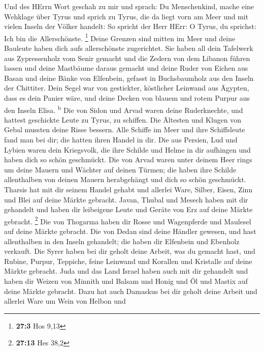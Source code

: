  Und des HErrn Wort geschah zu mir und sprach:
 Du Menschenkind, mache eine Wehklage über Tyrus
 und sprich zu Tyrus, die da liegt vorn am Meer und mit
vielen Inseln der Völker handelt: So spricht der Herr HErr: O Tyrus, du
sprichst: Ich bin die Allerschönste. \footnote{\textbf{27:3} Hos 9,13}
 Deine Grenzen sind mitten im Meer und deine Bauleute
haben dich aufs allerschönste zugerichtet.  Sie haben all
dein Tafelwerk aus Zypressenholz vom Senir gemacht und die Zedern von
dem Libanon führen lassen und deine Mastbäume daraus gemacht
 und deine Ruder von Eichen aus Basan und deine Bänke von
Elfenbein, gefasst in Buchsbaumholz aus den Inseln der Chittiter.
 Dein Segel war von gestickter, köstlicher Leinwand aus
Ägypten, dass es dein Panier wäre, und deine Decken von blauem und rotem
Purpur aus den Inseln Elisa. \textsuperscript{b}  Die von
Sidon und Arvad waren deine Ruderknechte, und hattest geschickte Leute
zu Tyrus, zu schiffen.  Die Ältesten und Klugen von Gebal
mussten deine Risse bessern. Alle Schiffe im Meer und ihre Schiffsleute
fand man bei dir; die hatten ihren Handel in dir.  Die
aus Persien, Lud und Lybien waren dein Kriegsvolk, die ihre Schilde und
Helme in dir aufhingen und haben dich so schön geschmückt.
 Die von Arvad waren unter deinem Heer rings um deine
Mauern und Wächter auf deinen Türmen; die haben ihre Schilde
allenthalben von deinen Mauern herabgehängt und dich so schön
geschmückt.  Tharsis hat mit dir seinem Handel gehabt und
allerlei Ware, Silber, Eisen, Zinn und Blei auf deine Märkte gebracht.
 Javan, Thubal und Mesech haben mit dir gehandelt und
haben dir leibeigene Leute und Geräte von Erz auf deine Märkte gebracht.
\footnote{\textbf{27:13} Hes 38,2}  Die von Thogarma
haben dir Rosse und Wagenpferde und Maulesel auf deine Märkte gebracht.
 Die von Dedan sind deine Händler gewesen, und hast
allenthalben in den Inseln gehandelt; die haben dir Elfenbein und
Ebenholz verkauft.  Die Syrer haben bei dir geholt deine
Arbeit, was du gemacht hast, und Rubine, Purpur, Teppiche, feine
Leinwand und Korallen und Kristalle auf deine Märkte gebracht.
 Juda und das Land Israel haben auch mit dir gehandelt
und haben dir Weizen von Minnith und Balsam und Honig und Öl und Mastix
auf deine Märkte gebracht.  Dazu hat auch Damaskus bei
dir geholt deine Arbeit und allerlei Ware um Wein von Helbon und
